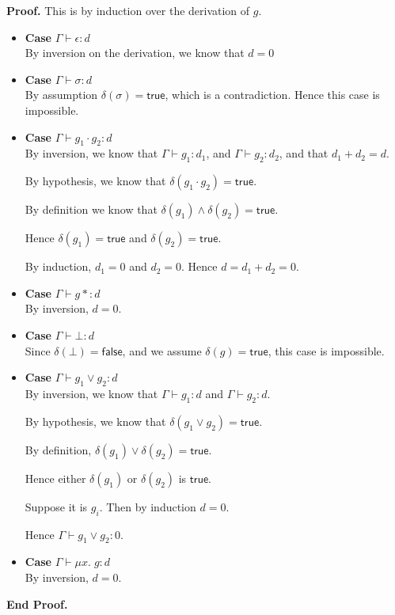 \documentclass{article}
\newcommand{\fix}[2]{\mu {#1}.\;{#2}}
\newcommand{\judgebalance}[3][\Gamma]{{#1} \vdash {#2} : {#3}}
\newcommand{\true}{\mathsf{true}}
\newcommand{\false}{\mathsf{false}}
\newcommand{\emptify}[1]{\delta({#1})}
\newenvironment{proof}{\noindent\textbf{Proof.}}
{\noindent\textbf{End Proof.}}
\newenvironment{caseblock}{\begin{itemize}}{\end{itemize}}
\newenvironment{case}[1]{\item \textbf{Case} {#1}\\}{}
\begin{document}
\begin{proof}
  This is by induction over the derivation of $g$. 
  \begin{caseblock}
    \begin{case}{$\judgebalance{\epsilon}{d}$}
      By inversion on the derivation, we know that $d = 0$
    \end{case}

    \begin{case}{$\judgebalance{\sigma}{d}$}
      By assumption $\emptify{\sigma} = \true$, which is a contradiction. Hence this
      case is impossible. 
    \end{case}

    \begin{case}{$\judgebalance{g_1\cdot g_2}{d}$}
      By inversion, we know that $\judgebalance{g_1}{d_1}$, and
      $\judgebalance{g_2}{d_2}$, and that $d_1 + d_2 = d$.  

      By hypothesis, we know that $\emptify{g_1\cdot g_2} = \true$. 

      By definition we know that $\emptify{g_1} \land \emptify{g_2} =
      \true$. 

      Hence $\emptify{g_1} = \true$ and $\emptify{g_2} = \true$.

      By induction, $d_1 = 0$ and $d_2 = 0$. Hence $d = d_1 + d_2 = 0$. 
    \end{case}

    \begin{case}{$\judgebalance{g*}{d}$}
      By inversion, $d = 0$. 
    \end{case}

    \begin{case}{$\judgebalance{\bot}{d}$}
      Since $\emptify{\bot} = \false$, and we assume $\emptify{g} = \true$, this case is
      impossible. 
    \end{case}

    \begin{case}{$\judgebalance{g_1 \vee g_2}{d}$}
      By inversion, we know that $\judgebalance{g_1}{d}$ and $\judgebalance{g_2}{d}$. 
      
      By hypothesis, we know that $\emptify{g_1 \vee g_2} = \true$. 

      By definition, $\emptify{g_1} \vee \emptify{g_2} = \true$. 
      
      Hence either $\emptify{g_1}$ or $\emptify{g_2}$ is $\true$. 

      Suppose it is $g_i$. Then by induction $d = 0$. 

      Hence $\judgebalance{g_1 \vee g_2}{0}$. 
    \end{case}

    \begin{case}{$\judgebalance{\fix{x}{g}}{d}$}
      By inversion, $d = 0$. 
    \end{case}
  \end{caseblock}
\end{proof}
\end{document}
